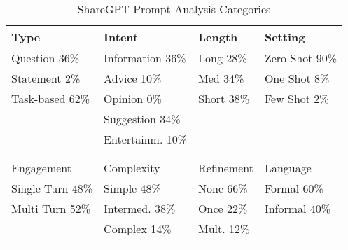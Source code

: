 \begin{table}[]
    \centering
    \caption{ShareGPT Prompt Analysis Categories}
    \begin{tabular}{@{}llll@{}}
        \toprule
        Type        & Intent        & Length              & Setting   \\ \midrule
        Question \hfill 36\%    & Information \hfill 36\%   & Long \hfill 28\%  & Zero
        Shot \hfill 90\% \\
        Statement \hfill 2\%    & Advice \hfill 10\%        & Med \hfill 34\% & One Shot \hfill 8\% \\
        Task-based \hfill 62\%  & Opinion \hfill 0\%       & Short \hfill 38\% & Few Shot \hfill
        2\% \\
                                & Suggestion \hfill 34\%   &                    &           \\
                                & Entertainm. \hfill 10\% &                    &           \\
                                &                           &                    &           \\
                                &                            &                    &           \\
        \toprule
        Engagement              & Complexity    & Refinement         & Language  \\ \midrule
        Single Turn \hfill 48\%  & Simple \hfill 48\%       & None     \hfill 66\%           &
        Formal \hfill 60\%\\
        Multi Turn \hfill 52\%   & Intermed. \hfill 38\% & Once     \hfill 22\%          &
        Informal \hfill 40\%\\
                                & Complex \hfill 14\%      & Mult. \hfill 12\%           &           \\ \\
        \bottomrule
    \end{tabular}
    \label{tab:sharegpt-prompt-analysis-categories}
\end{table}

